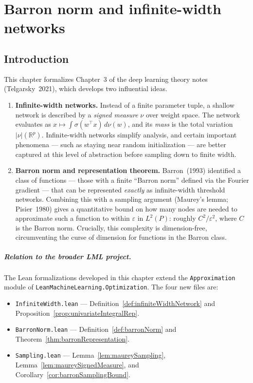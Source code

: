 \chapter{Barron norm and infinite-width networks}
\label{chap:barron}

\section{Introduction}

This chapter formalizes Chapter~3 of the deep learning theory notes (Telgarsky~2021),
which develops two influential ideas.

\begin{enumerate}
  \item \textbf{Infinite-width networks.}  Instead of a finite parameter tuple, a shallow
    network is described by a \emph{signed measure} $\nu$ over weight space.  The network
    evaluates as $x \mapsto \int \sigma(w^\top x)\,d\nu(w)$, and its \emph{mass} is the
    total variation $|\nu|(\mathbb{R}^p)$.  Infinite-width networks simplify analysis,
    and certain important phenomena — such as staying near random initialization — are
    better captured at this level of abstraction before sampling down to finite width.

  \item \textbf{Barron norm and representation theorem.}  Barron~(1993) identified a class
    of functions — those with a finite ``Barron norm'' defined via the Fourier gradient —
    that can be represented \emph{exactly} as infinite-width threshold networks.  Combining
    this with a sampling argument (Maurey's lemma; Pisier~1980) gives a quantitative bound
    on how many nodes are needed to approximate such a function to within $\varepsilon$
    in $L^2(P)$: roughly $C^2/\varepsilon^2$, where $C$ is the Barron norm.
    Crucially, this complexity is dimension-free, circumventing the curse of dimension for
    functions in the Barron class.
\end{enumerate}

\paragraph{Relation to the broader LML project.}
The Lean formalizations developed in this chapter extend the
\texttt{Approximation} module of \texttt{LeanMachineLearning.Optimization}.
The four new files are:

\begin{itemize}
  \item \texttt{InfiniteWidth.lean} — Definition~\ref{def:infiniteWidthNetwork} and
    Proposition~\ref{prop:univariateIntegralRep}.
  \item \texttt{BarronNorm.lean} — Definition~\ref{def:barronNorm} and
    Theorem~\ref{thm:barronRepresentation}.
  \item \texttt{Sampling.lean} — Lemma~\ref{lem:maureySampling},
    Lemma~\ref{lem:maureySignedMeasure}, and
    Corollary~\ref{cor:barronSamplingBound}.
\end{itemize}

